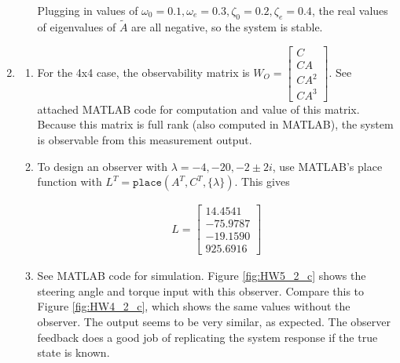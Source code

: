 \documentclass[11pt]{article}
\theoremstyle{definition}
\begin{document}
\begin{enumerate}
\begin{enumerate}
        Plugging in values of $\omega_0 = 0.1, \omega_e = 0.3, \zeta_0 = 0.2, \zeta_e = 0.4$, the real values of eigenvalues of $\tilde{A}$ are all negative, so the system is stable.

    \end{enumerate}
    \item %
    \begin{enumerate}
        \item %
        For the 4x4 case, the observability matrix is $W_O = \begin{bmatrix} C \\ CA \\CA^2 \\CA^3 \end{bmatrix}$.  See attached MATLAB code for computation and value of this matrix.  Because this matrix is full rank (also computed in MATLAB), the system is observable from this measurement output.

        \item %
        To design an observer with $\lambda = -4, -20, -2\pm2i$, use MATLAB's place function with $L^T = \mathtt{place}(A^T, C^T, \{ \lambda \})$.  This gives

        \begin{align*}
            L = \begin{bmatrix}    14.4541 \\  -75.9787 \\  -19.1590 \\  925.6916 \end{bmatrix}
        \end{align*}

        \item %
        See MATLAB code for simulation.  Figure \ref{fig:HW5_2_c} shows the steering angle and torque input with this observer.  Compare this to Figure \ref{fig:HW4_2_c}, which shows the same values without the observer.  The output seems to be very similar, as expected.  The observer feedback does a good job of replicating the system response if the true state is known.


\end{enumerate}
\end{enumerate}
\end{document}
